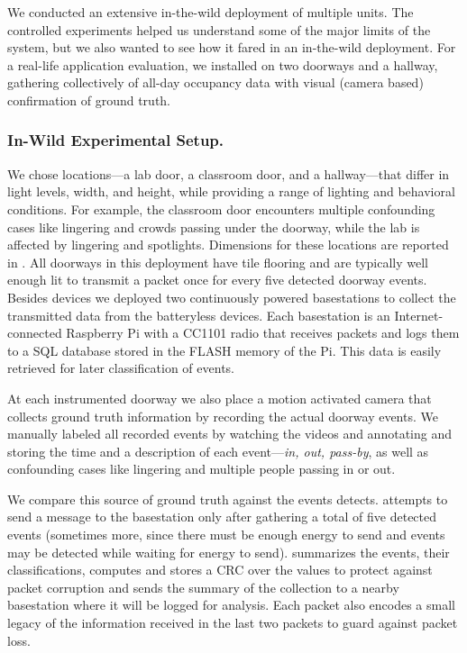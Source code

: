 We conducted an extensive in-the-wild deployment of multiple \sysname units.
The controlled experiments helped us understand some of the major limits of the system, but we also wanted to see how it fared in an in-the-wild deployment.  
For a real-life application evaluation, we installed \sysname on two doorways and a hallway, gathering \ITWdays collectively of all-day occupancy data with visual (camera based) confirmation of ground truth. 

\subsubsection{In-Wild Experimental Setup.}
We chose locations---a lab door, a classroom door, and a hallway---that differ in light levels, width, and height, while providing a range of lighting and behavioral conditions. 
For example, the classroom door encounters multiple confounding cases like lingering and crowds passing under the doorway, while the lab is affected by lingering and spotlights.
Dimensions for these locations are reported in .  %
All doorways in this deployment have tile flooring and are typically well enough lit to transmit a packet once for every five detected doorway events. 
Besides \sysname devices we deployed two continuously powered basestations to collect the transmitted data from the batteryless \sysname devices.
Each basestation is an Internet-connected Raspberry Pi with a CC1101 radio that receives packets and logs them to a SQL database stored in the FLASH memory of the Pi. This data is easily retrieved for later classification of events.  

At each instrumented doorway we also place a motion activated camera that collects ground truth information by recording the actual doorway events. 
We manually labeled all recorded events by watching the videos and annotating and storing the time and a description of each event---\textit{in, out, pass-by}, as well as confounding cases like lingering and multiple people passing in or out.

We compare this source of ground truth against the events \sysname detects.
\sysname attempts to send a message to the basestation only after gathering a total of five detected events (sometimes more, since there must be enough energy to send and events may be detected while waiting for energy to send).
\sysname summarizes the events, their classifications, computes and stores a CRC over the values to protect against packet corruption and sends the summary of the collection to a nearby basestation where it will be logged for analysis. 
Each packet also encodes a small legacy of the information received in the last two packets to guard against packet loss. 

